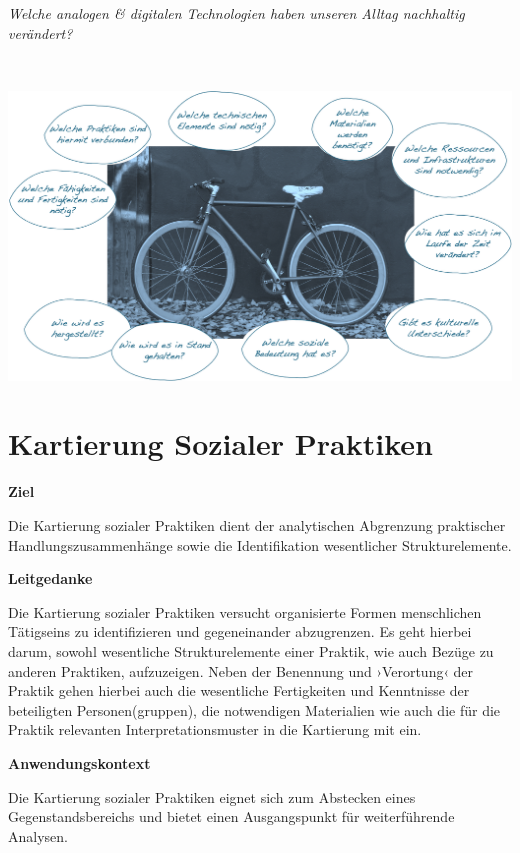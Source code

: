 \documentclass[
  a4paper,
]{book}
\begin{document}
\begin{blackbox}
\emph{Welche analogen \& digitalen Technologien haben unseren Alltag nachhaltig verändert?}

\end{blackbox}

~

\begin{center}\includegraphics{Figures/05-02-Fahrrad} \end{center}

\section{Kartierung Sozialer Praktiken}\label{kartierung-sozialer-praktiken}

\textbf{Ziel}

Die Kartierung sozialer Praktiken dient der analytischen Abgrenzung praktischer Handlungszusammenhänge sowie die Identifikation wesentlicher Strukturelemente.

\textbf{Leitgedanke}

Die Kartierung sozialer Praktiken versucht organisierte Formen menschlichen Tätigseins zu identifizieren und gegeneinander abzugrenzen. Es geht hierbei darum, sowohl wesentliche Strukturelemente einer Praktik, wie auch Bezüge zu anderen Praktiken, aufzuzeigen. Neben der Benennung und ›Verortung‹ der Praktik gehen hierbei auch die wesentliche Fertigkeiten und Kenntnisse der beteiligten Personen(gruppen), die notwendigen Materialien wie auch die für die Praktik relevanten Interpretationsmuster in die Kartierung mit ein.

\textbf{Anwendungskontext}

Die Kartierung sozialer Praktiken eignet sich zum Abstecken eines Gegenstandsbereichs und bietet einen Ausgangspunkt für weiterführende Analysen.
\end{document}

